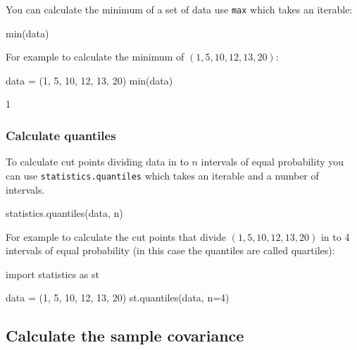 You can calculate the minimum of a set of data use \texttt{max} which takes an iterable:


\begin{api}
min(data)
\end{api}



For example to calculate the minimum of \((1, 5, 10, 12, 13, 20)\):




\begin{pyin}
data = (1, 5, 10, 12, 13, 20)
min(data)
\end{pyin}





\begin{raw}
1
\end{raw}





\subsubsection{Calculate quantiles}
\label{\detokenize{tools-for-mathematics/08-statistics/how/main:calculate-quantiles}}

To calculate cut points dividing data in to \(n\) intervals of equal probability
you can use \texttt{statistics.quantiles} which takes an iterable and a number of
intervals.


\begin{api}
statistics.quantiles(data, n)
\end{api}



For example to calculate the cut points that divide \((1, 5, 10, 12, 13, 20)\) in
to 4 intervals of equal probability (in this case the quantiles are called
quartiles):




\begin{pyin}
import statistics as st

data = (1, 5, 10, 12, 13, 20)
st.quantiles(data, n=4)
\end{pyin}





\begin{raw}
[4.0, 11.0, 14.75]
\end{raw}





\subsection{Calculate the sample covariance}
\label{\detokenize{tools-for-mathematics/08-statistics/how/main:calculate-the-sample-covariance}}

